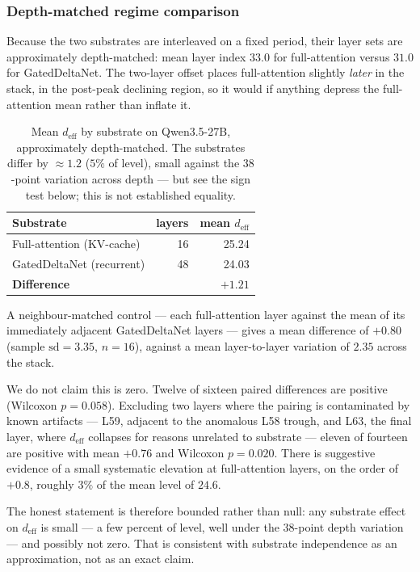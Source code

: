 \subsubsection{Depth-matched regime comparison}

Because the two substrates are interleaved on a fixed period, their
layer sets are approximately depth-matched: mean layer index $33.0$
for full-attention versus $31.0$ for GatedDeltaNet. The two-layer
offset places full-attention slightly \emph{later} in the stack, in the
post-peak declining region, so it would if anything depress the
full-attention mean rather than inflate it.

\begin{table}[ht]
\centering
\small
\caption{Mean $d_\text{eff}$ by substrate on Qwen3.5-27B, approximately
depth-matched. The substrates differ by ${\approx}1.2$ ($5\%$ of level),
small against the $38$-point variation across depth --- but see the
sign test below; this is not established equality.}
\label{tab:regime}
\begin{tabular}{lrr}
\toprule
\textbf{Substrate} & \textbf{layers} & \textbf{mean $d_\text{eff}$} \\
\midrule
Full-attention (KV-cache)     & 16 & 25.24 \\
GatedDeltaNet (recurrent)     & 48 & 24.03 \\
\midrule
\textbf{Difference}           &    & \textbf{$+1.21$} \\
\bottomrule
\end{tabular}
\end{table}

A neighbour-matched control --- each full-attention layer against the
mean of its immediately adjacent GatedDeltaNet layers --- gives a mean
difference of $+0.80$ (sample $\text{sd}{=}3.35$, $n{=}16$), against a
mean layer-to-layer variation of $2.35$ across the stack.

We do not claim this is zero. Twelve of sixteen paired differences are
positive (Wilcoxon $p{=}0.058$). Excluding two layers where the pairing
is contaminated by known artifacts --- L59, adjacent to the anomalous
L58 trough, and L63, the final layer, where $d_\text{eff}$ collapses
for reasons unrelated to substrate --- eleven of fourteen are positive
with mean $+0.76$ and Wilcoxon $p{=}0.020$. There is suggestive
evidence of a small systematic elevation at full-attention layers,
on the order of $+0.8$, roughly $3\%$ of the mean level of $24.6$.

The honest statement is therefore bounded rather than null: any
substrate effect on $d_\text{eff}$ is small --- a few percent
of level, well under the $38$-point depth variation --- and possibly
not zero. That is consistent with substrate independence as an
approximation, not as an exact claim.

